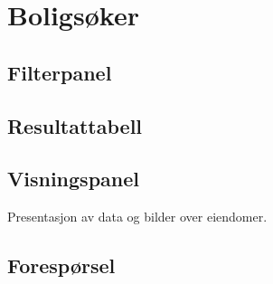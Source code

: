\section{Boligsøker}

\subsection{Filterpanel}
\subsection{Resultattabell}
\subsection{Visningspanel}
Presentasjon av data og bilder over eiendomer.
\subsection{Forespørsel}
